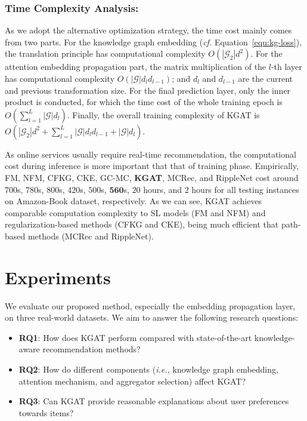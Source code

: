 \documentclass[sigconf]{acmart}
\newcommand{\Mat}[1]{\mathbf{#1}}
\newcommand{\Set}[1]{\mathcal{#1}}
\newcommand{\ie}{\emph{i.e., }}
\newcommand{\cf}{\emph{cf. }}
\theoremstyle{definition}
\begin{document}
\subsubsection{\textbf{Time Complexity Analysis:}}
As we adopt the alternative optimization strategy, the time cost mainly comes from two parts.
For the knowledge graph embedding (\cf Equation~\eqref{equ:kg-loss}), the translation principle has computational complexity $O(|\Set{G}_{2}|d^{2})$.
For the attention embedding propagation part, the matrix multiplication of the $l$-th layer has computational complexity $O(|\Set{G}|d_{l}d_{l-1})$; and $d_{l}$ and $d_{l-1}$ are the current and previous transformation size.
For the final prediction layer, only the inner product is conducted, for which the time cost of the whole training epoch is $O(\sum_{l=1}^{L}|\Set{G}|d_{l})$.
Finally, the overall training complexity of KGAT is $O(|\Set{G}_{2}|d^{2}+\sum_{l=1}^{L}|\Set{G}|d_{l}d_{l-1} +|\Set{G}|d_{l})$.

As online services usually require real-time recommendation, the computational cost during inference is more important that that of training phase. Empirically, FM, NFM, CFKG, CKE, GC-MC, \textbf{KGAT}, MCRec, and RippleNet cost around $700$s, $780$s, $800$s, $420$s, $500$s, $\Mat{560}$s, $20$ hours, and $2$ hours for all testing instances on Amazon-Book dataset, respectively.
As we can see, KGAT achieves comparable computation complexity to SL models (FM and NFM) and regularization-based methods (CFKG and CKE), being much efficient that path-based methods (MCRec and RippleNet).







 \section{Experiments}

We evaluate our proposed method, especially the embedding propagation layer, on three real-world datasets.
We aim to answer the following research questions:
\begin{itemize}[leftmargin=*]
	\item \textbf{RQ1}: How does KGAT perform compared with state-of-the-art knowledge-aware recommendation methods?
	\item \textbf{RQ2}: How do different components (\ie knowledge graph embedding, attention mechanism, and aggregator selection) affect KGAT?
\item \textbf{RQ3}: Can KGAT provide reasonable explanations about user preferences towards items?
\end{itemize}
\end{document}
